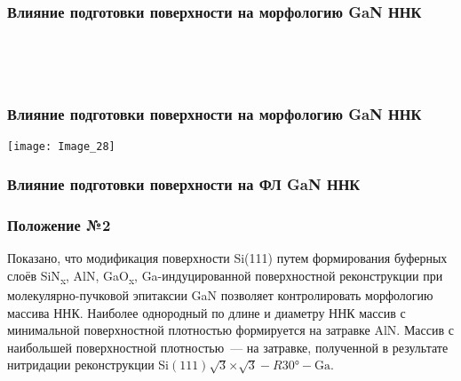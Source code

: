 \begin{frame}
	\frametitle{Влияние подготовки поверхности на морфологию GaN ННК}
	\centering
	\begin{minipage}[t]{0.31\linewidth}
	\end{minipage}
	\\
	\bigskip
	\begin{minipage}[t]{0.31\linewidth}
	\end{minipage}
	\begin{minipage}[t]{0.31\linewidth}
	\end{minipage}
	\begin{minipage}[t]{0.31\linewidth}
	\end{minipage}
	\\
	\bigskip
	\begin{minipage}[t]{0.31\linewidth}
	\end{minipage}
	\begin{minipage}[t]{0.31\linewidth}
	\end{minipage}
	\begin{minipage}[t]{0.31\linewidth}
	\end{minipage}
\end{frame}

\begin{frame}
	\frametitle{Влияние подготовки поверхности на морфологию GaN ННК}
	\centering
	\texttt{[image: Image\_28]}
\end{frame}

\begin{frame}
	\frametitle{Влияние подготовки поверхности на ФЛ GaN ННК}
	\centering
	\begin{minipage}[t]{0.47\linewidth}
	\end{minipage}
	\begin{minipage}[t]{0.47\linewidth}
	\end{minipage}
\end{frame}

\begin{frame}
	\frametitle{Положение №2}
	\large
Показано, что модификация поверхности Si(111) путем формирования
буферных слоёв SiN\textsubscript{x}, AlN, GaO\textsubscript{x},
Ga-индуцированной поверхностной реконструкции при молекулярно-пучковой
эпитаксии GaN позволяет контролировать морфологию массива ННК. Наиболее
однородный по длине и диаметру ННК массив с минимальной поверхностной
плотностью формируется на затравке AlN. Массив с наибольшей поверхностной
плотностью~--- на затравке, полученной в результате нитридации реконструкции
Si\((111)\sqrt{3}\)\(\times\)\(\sqrt{3} - R30\si{\degree} - \text{Ga}\).
\end{frame}

